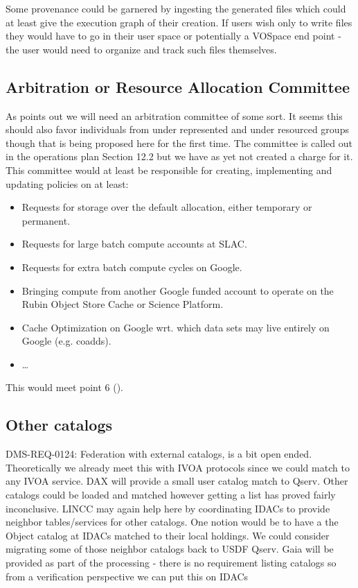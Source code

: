 Some provenance could be garnered by ingesting the generated files which could at least give the execution graph of their creation.
If users wish only to write files they would have to go in their user space or potentially a VOSpace end point - the user would need to organize and track such files themselves.


\subsection{Arbitration or Resource Allocation Committee}\label{sec:arbitration}
As  points out we will need an arbitration committee of some sort.
It seems this should also favor individuals from under represented  and under resourced groups though that is being proposed here for the first time.
The committee is called out in the operations plan  Section 12.2 but we have as yet not created a charge for it.
This committee would at least be responsible for creating, implementing and updating  policies on at least:

\begin{itemize}
\item Requests for storage over the default allocation, either temporary or permanent.
\item Requests for large batch compute accounts at SLAC.
\item Requests for extra batch compute cycles on Google.
\item Bringing compute from another Google funded account to operate on the Rubin Object Store Cache or Science Platform.
\item Cache Optimization on Google wrt. which data sets may live entirely on Google (e.g. coadds).
\item \ldots
\end{itemize}

This would meet  point 6  ().

\subsection{Other catalogs}

DMS-REQ-0124: Federation with external catalogs, is a bit open ended.
Theoretically we already meet this with IVOA protocols since we could match to any IVOA service.
DAX will provide a small user catalog match to Qserv.
Other catalogs could be loaded and matched however getting a list has proved fairly inconclusive.
LINCC may again help here by coordinating IDACs to provide neighbor tables/services for other catalogs.
One notion would be to have a the Object catalog at IDACs matched to their local holdings.
We could consider migrating some of those neighbor catalogs back to USDF Qserv.
Gaia will be provided as part of the processing - there is no requirement listing catalogs so from a verification perspective we can put this on IDACs

